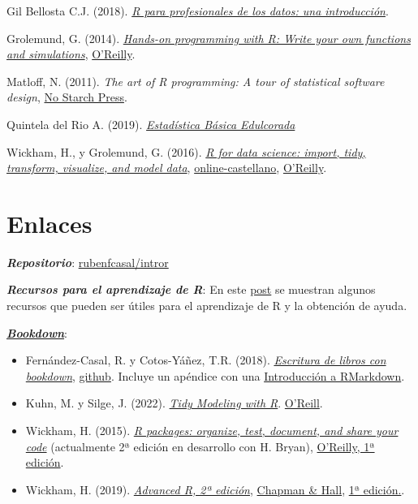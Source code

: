 \documentclass[
]{book}
\theoremstyle{break}
\theoremstyle{nonumberplain}
\begin{document}
Gil Bellosta C.J. (2018). \emph{\href{https://www.datanalytics.com/libro_r/index.html}{R para profesionales de los datos: una introducción}}.

Grolemund, G. (2014). \emph{\href{https://rstudio-education.github.io/hopr}{Hands-on programming with R: Write your own functions and simulations}}, \href{http://shop.oreilly.com/product/0636920028574.do}{O'Reilly}.

Matloff, N. (2011). \emph{The art of R programming: A tour of statistical software design}, \href{https://www.nostarch.com/artofr.htm}{No Starch Press}.

Quintela del Rio A. (2019). \emph{\href{https://bookdown.org/aquintela/EBE}{Estadística Básica Edulcorada}}

Wickham, H., y Grolemund, G. (2016). \emph{\href{http://r4ds.had.co.nz}{R for data science: import, tidy, transform, visualize, and model data}}, \href{https://es.r4ds.hadley.nz}{online-castellano}, \href{http://shop.oreilly.com/product/0636920034407.do}{O'Reilly}.

\hypertarget{links}{%
\section*{Enlaces}\label{links}}

\textbf{\emph{Repositorio}}: \href{https://github.com/rubenfcasal/intror}{rubenfcasal/intror}

\textbf{\emph{Recursos para el aprendizaje de R}}: En este \href{https://rubenfcasal.github.io/post/ayuda-y-recursos-para-el-aprendizaje-de-r}{post} se muestran algunos recursos que pueden ser útiles para el aprendizaje de R y la obtención de ayuda.

\href{https://bookdown.org}{\textbf{\emph{Bookdown}}}:

\begin{itemize}
\item
  Fernández-Casal, R. y Cotos-Yáñez, T.R. (2018). \emph{\href{https://rubenfcasal.github.io/bookdown_intro}{Escritura de libros con bookdown}}, \href{https://github.com/rubenfcasal/bookdown_intro}{github}. Incluye un apéndice con una \href{https://rubenfcasal.github.io/bookdown_intro/rmarkdown.html}{Introducción a RMarkdown}.
\item
  Kuhn, M. y Silge, J. (2022). \emph{\href{https://www.tmwr.org}{Tidy Modeling with R}}. \href{https://amzn.to/35Hn96s}{O'Reill}.
\item
  Wickham, H. (2015). \emph{\href{http://r-pkgs.had.co.nz/}{R packages: organize, test, document, and share your code}} (actualmente 2ª edición en desarrollo con H. Bryan), \href{http://shop.oreilly.com/product/0636920034421.do}{O'Reilly, 1ª edición}.
\item
  Wickham, H. (2019). \emph{\href{https://adv-r.hadley.nz/}{Advanced R, 2ª edición}}, \href{https://www.amazon.com/dp/0815384572}{Chapman \& Hall}, \href{http://adv-r.had.co.nz/}{1ª edición.}.
\end{itemize}
\end{document}
